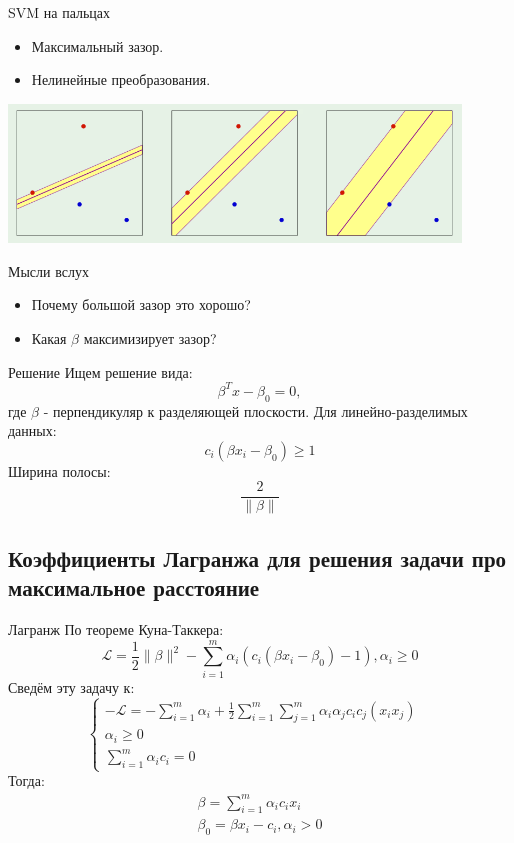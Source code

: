 \documentclass[14pt, fleqn, xcolor={dvipsnames, table}]{beamer}
\begin{document}
\begin{frame}{SVM на пальцах}
\begin{itemize}
  \item Максимальный зазор.
  \item Нелинейные преобразования.
\end{itemize}
\begin{center}
\includegraphics[width=0.9\textwidth]{SVM_1.png}
\end{center}
\end{frame}

\begin{frame}{Мысли вслух}
\begin{itemize}
  \item Почему большой зазор это хорошо?
  \item Какая $\beta$ максимизирует зазор? 
\end{itemize}
\end{frame}

\begin{frame}{Решение}
Ищем решение вида: \
$$
\beta^Tx - \beta_0 = 0,
$$ 
где $\beta$ - перпендикуляр к разделяющей плоскости. Для линейно-разделимых данных: \
$$
c_i(\beta x_i - \beta_0) \ge 1
$$
Ширина полосы: \
$$
\frac{2}{\|\beta\|}
$$
\end{frame}

\subsection{Коэффициенты Лагранжа для решения задачи про максимальное расстояние}
\begin{frame}{Лагранж}
По теореме Куна-Таккера: \
$$
\mathcal{L} = \frac{1}{2}\|\beta\|^2 - \sum_{i=1}^m\alpha_i(c_i(\beta x_i - \beta_0) - 1), \alpha_i \ge 0
$$ 
Сведём эту задачу к: \
$$
\left\{  
           \begin{array}{ll}  
            -\mathcal{L} = -\sum_{i=1}^m\alpha_i + \frac{1}{2}\sum_{i=1}^m\sum_{j=1}^m\alpha_i\alpha_jc_ic_j(x_ix_j) \\  
            \alpha_i \ge 0 & \\
            \sum_{i=1}^m\alpha_ic_i = 0
           \end{array}   
           \right.
$$
Тогда: \
$$\begin{array}{l}
\beta = \sum_{i=1}^m\alpha_ic_ix_i \\
\beta_0 = \beta x_i - c_i, \alpha_i > 0
\end{array}$$ 
\end{frame}
\end{document}
